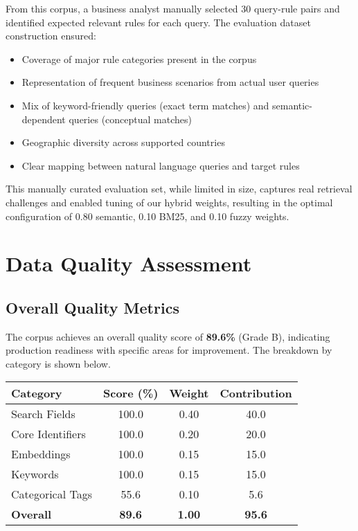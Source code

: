 From this corpus, a business analyst manually selected 30 query-rule pairs and identified expected relevant rules for each query. The evaluation dataset construction ensured:
\begin{itemize}[leftmargin=*,itemsep=2pt,topsep=2pt]
 \item Coverage of major rule categories present in the corpus
 \item Representation of frequent business scenarios from actual user queries
 \item Mix of keyword-friendly queries (exact term matches) and semantic-dependent queries (conceptual matches)
 \item Geographic diversity across supported countries
 \item Clear mapping between natural language queries and target rules
\end{itemize}

This manually curated evaluation set, while limited in size, captures real retrieval challenges and enabled tuning of our hybrid weights, resulting in the optimal configuration of 0.80 semantic, 0.10 BM25, and 0.10 fuzzy weights.

\section{Data Quality Assessment}

\subsection{Overall Quality Metrics}

The corpus achieves an overall quality score of \textbf{89.6\%} (Grade B), indicating production readiness with specific areas for improvement. The breakdown by category is shown below.

\vspace{0.5em}
\noindent
\begin{minipage}{\textwidth}
\centering
\begin{tabular}{lccc}
\toprule
\textbf{Category} & \textbf{Score (\%)} & \textbf{Weight} & \textbf{Contribution} \\
\midrule
Search Fields & 100.0 & 0.40 & 40.0 \\
Core Identifiers & 100.0 & 0.20 & 20.0 \\
Embeddings & 100.0 & 0.15 & 15.0 \\
Keywords & 100.0 & 0.15 & 15.0 \\
Categorical Tags & 55.6 & 0.10 & 5.6 \\
\midrule
\textbf{Overall} & \textbf{89.6} & \textbf{1.00} & \textbf{95.6} \\
\bottomrule
\end{tabular}
\label{tab:quality-breakdown}
\end{minipage}
\vspace{0.5em}

